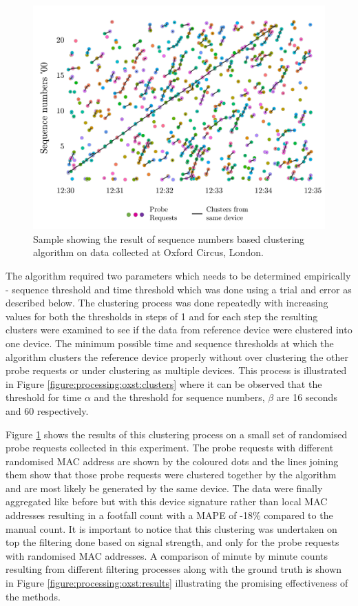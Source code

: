 \begin{figure}
  \includegraphics[trim={3 3 3 3},clip]{images/processing-oxst-fingerprinting.jpg}
  \caption{Sample showing the result of sequence numbers based clustering algorithm on data collected at Oxford Circus, London.}
  \label{figure:processing:oxst:fingerprinting}
\end{figure}

The algorithm required two parameters which needs to be determined empirically - sequence threshold and time threshold which was done using a trial and error as described below.
The clustering process was done repeatedly with increasing values for both the thresholds in steps of 1 and for each step the resulting clusters were examined to see if the data from reference device were clustered into one device.
The minimum possible time and sequence thresholds at which the algorithm clusters the reference device properly without over clustering the other probe requests or under clustering as multiple devices.
This process is illustrated in Figure \ref{figure:processing:oxst:clusters} where it can be observed that the threshold for time $\alpha$ and the threshold for sequence numbers, $\beta$ are 16 seconds and 60 respectively.

Figure \ref{figure:processing:oxst:fingerprinting} shows the results of this clustering process on a small set of randomised probe requests collected in this experiment.
The probe requests with different randomised MAC address are shown by the coloured dots and the lines joining them show that those probe requests were clustered together by the algorithm and are most likely be generated by the same device.
The data were finally aggregated like before but with this device signature rather than local MAC addresses resulting in a footfall count with a MAPE of -18\% compared to the manual count.
It is important to notice that this clustering was undertaken on top the filtering done based on signal strength, and only for the probe requests with randomised MAC addresses.
A comparison of minute by minute counts resulting from different filtering processes along with the ground truth is shown in Figure \ref{figure:processing:oxst:results} illustrating the promising effectiveness of the methods.

